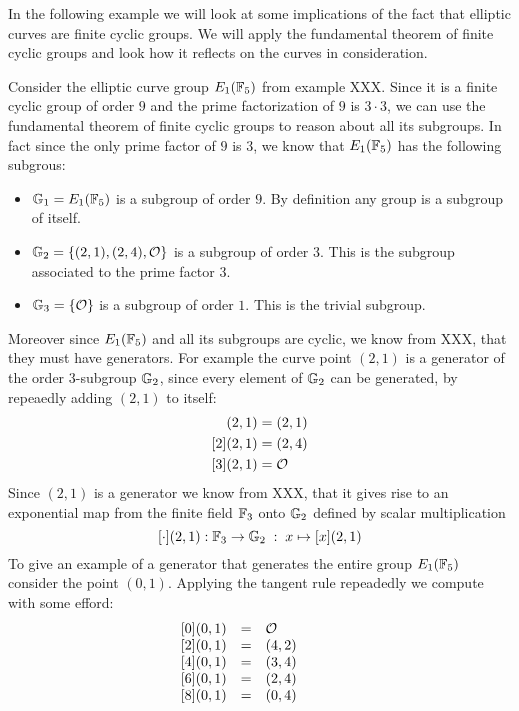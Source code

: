 In the following example we will look at some implications of the fact that elliptic curves are finite cyclic groups. We will apply the fundamental theorem of finite cyclic groups and look how it reflects on the curves in consideration.
\begin{example}Consider the elliptic curve group $E_1(\F_5)$ from example XXX. Since it is a finite cyclic group of order $9$ and the prime factorization of $9$ is $3\cdot 3$, we can use the fundamental theorem of finite cyclic groups to reason about all its subgroups. In fact since the only prime factor of $9$ is $3$, we know that $E_1(\F_5)$ has the following subgrous:
\begin{itemize}
\item $\G_1 = E_1(\F_5)$ is a subgroup of order $9$. By definition any group is a subgroup of itself.
\item $\G_2 = \{(2,1),(2,4),\Oinf\}$ is a subgroup of order $3$. This is the subgroup associated to the prime factor $3$.
\item $\G_3 = \{\Oinf\}$ is a subgroup of order $1$. This is the trivial subgroup.
\end{itemize}
Moreover since $E_1(\F_5)$ and all its subgroups are cyclic, we know from XXX, that they must have generators. For example the curve point $(2,1)$ is a generator of the order $3$-subgroup $\G_2$, since every element of $\G_2$ can be generated, by repeaedly adding $(2,1)$ to itself:
\begin{align*}
[1](2,1) & = (2,1) \\
[2](2,1) & = (2,4) \\
[3](2,1) & = \Oinf
\end{align*}
Since $(2,1)$ is a generator we know from XXX, that it gives rise to an exponential map from the finite field $\F_3$ onto $\G_2$ defined by scalar multiplication
$$
[\cdot](2,1): \F_3 \to \G_2\; : \; x\mapsto [x](2,1)
$$
To give an example of a generator that generates the entire group $E_1(\F_5)$ consider the point $(0,1)$. Applying the tangent rule repeadedly we compute with some efford:
$$
\begin{array}{lccr}
{}\begin{array}{lcl}
{}[0](0,1) &=& \Oinf \\
{}[2](0,1) &=& (4, 2) \\
{}[4](0,1) &=& (3, 4) \\
{}[6](0,1) &=& (2, 4) \\
{}[8](0,1) &=& (0, 4) \\
\end{array} & & &

\end{array}$$
\end{example}
